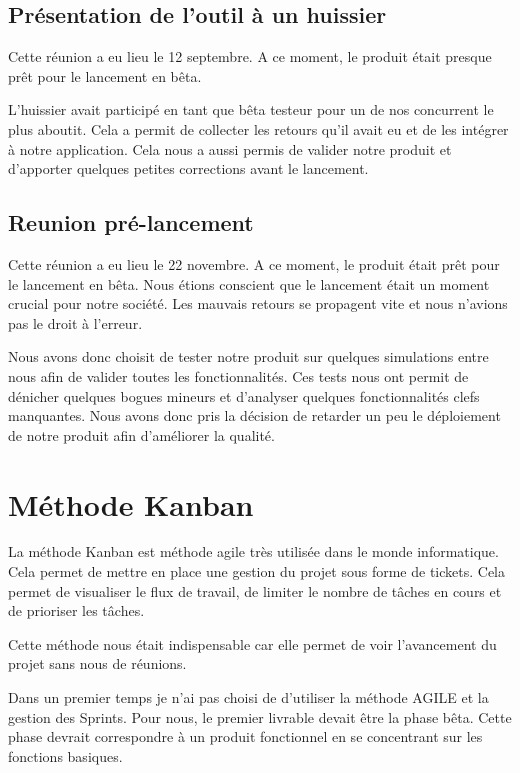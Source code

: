 \documentclass[]{report}
\begin{document}
    \subsection{Présentation de l’outil à un huissier}

      Cette réunion a eu lieu le 12 septembre. A ce moment, le produit était presque prêt pour le lancement en bêta.

      L'huissier avait participé en tant que bêta testeur pour un de nos concurrent le plus aboutit. Cela a permit de collecter les retours qu'il avait eu et de les intégrer à notre application. Cela nous a aussi permis de valider notre produit et d'apporter quelques petites corrections avant le lancement.

    \subsection{Reunion pré-lancement}

      Cette réunion a eu lieu le 22 novembre. A ce moment, le produit était prêt pour le lancement en bêta. Nous étions conscient que le lancement était un moment crucial pour notre société. Les mauvais retours se propagent vite et nous n'avions pas le droit à l'erreur.

      Nous avons donc choisit de tester notre produit sur quelques simulations entre nous afin de valider toutes les fonctionnalités. Ces tests nous ont permit de dénicher quelques bogues mineurs et d'analyser quelques fonctionnalités clefs manquantes. Nous avons donc pris la décision de retarder un peu le déploiement de notre produit afin d'améliorer la qualité.

  \section{Méthode Kanban}

    La méthode Kanban est méthode agile très utilisée dans le monde informatique. Cela permet de mettre en place une gestion du projet sous forme de tickets. Cela permet de visualiser le flux de travail, de limiter le nombre de tâches en cours et de prioriser les tâches.

    Cette méthode nous était indispensable car elle permet de voir l'avancement du projet sans nous  de réunions.

    Dans un premier temps je n'ai pas choisi de d'utiliser la méthode AGILE et la gestion des Sprints. Pour nous, le premier livrable devait être la phase bêta. Cette phase devrait correspondre à un produit fonctionnel en se concentrant sur les fonctions basiques.
\end{document}
